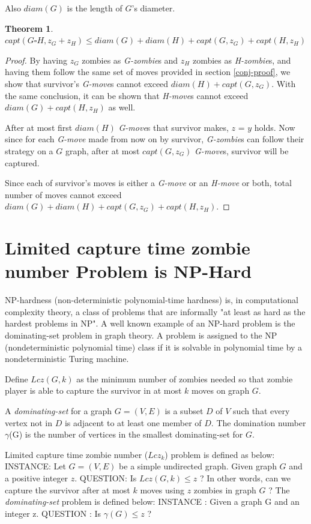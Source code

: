 \documentclass[1p]{elsarticle}
\newtheorem{theorem}{Theorem}
\begin{document}
	Also $diam(G)$ is the length of $G$'s diameter.
	\begin{theorem}
		\label{T5}
		$capt( G \square H, z_G + z_H ) \leq diam(G) + diam(H) + capt(G, z_G) + capt(H, z_H)$
	\end{theorem}
	\begin{proof}
		By having $z_G$ zombies as {\it G-zombie}s and $z_H$ zombies as {\it H-zombie}s, and having them follow the same
		set of moves provided in section \ref{conj-proof}, we show that survivor's {\it G-move}s cannot exceed $diam(H)
		+ capt(G, z_G)$. With the same conclusion, it can be shown that {\it H-move}s cannot exceed $diam(G) + capt(H, z_H)$
		as well.

		After at most first $diam(H)$ {\it G-move}s that survivor makes, $z$ = $y$ holds. Now since for each {\it
		G-move} made from now on by survivor, {\it G-zombie}s can follow their strategy on a $G$ graph, after at most
		$capt(G,z_G)$ {\it G-move}s, survivor will be captured. 
		
		Since each of survivor's moves is either a {\it G-move} or an {\it H-move} or both, total number of moves cannot
		exceed $diam(G) + diam(H) + capt(G, z_G) + capt(H, z_H)$.
	\end{proof}
\section{Limited capture time zombie number Problem is NP-Hard}\label{np-capturetime}

	NP-hardness (non-deterministic polynomial-time hardness) is, in computational complexity theory, a class of problems
	that are informally "at least as hard as the hardest problems in NP". A well known example of an NP-hard problem is
	the dominating-set problem in graph theory. A problem is assigned to the NP (nondeterministic polynomial time) class
	if it is solvable in polynomial time by a nondeterministic Turing machine.


	Define $Lcz(G,k)$ as the minimum number of zombies needed so that zombie player is able to capture the survivor in
	at most $k$ moves on graph $G$. 

	A {\it dominating-set} for a graph $G = (V, E)$ is a subset $D$ of $V$ such that every vertex not in $D$ is adjacent
	to at least one member of $D$. The domination number $\gamma$(G) is the number of vertices in the smallest
	dominating-set for $G$.
	
	Limited capture time zombie number ($Lcz_k$) problem is defined as below:
	{\newline}
	INSTANCE: Let $G = (V,E)$ be a simple undirected graph. Given graph $G$ and a positive integer $z$.
	{\newline}
	QUESTION: Is $Lcz(G,k) \leq z$ ? In other words, can we capture the survivor after at most $k$ moves using $z$ zombies in graph $G$ ?
	{\newline}
	{\newline}
	The {\it dominating-set} problem is defined below:
	{\newline}
	INSTANCE : Given a graph G and an integer z.
	{\newline}
	QUESTION : Is $\gamma(G) \leq z$ ?
\end{document}
